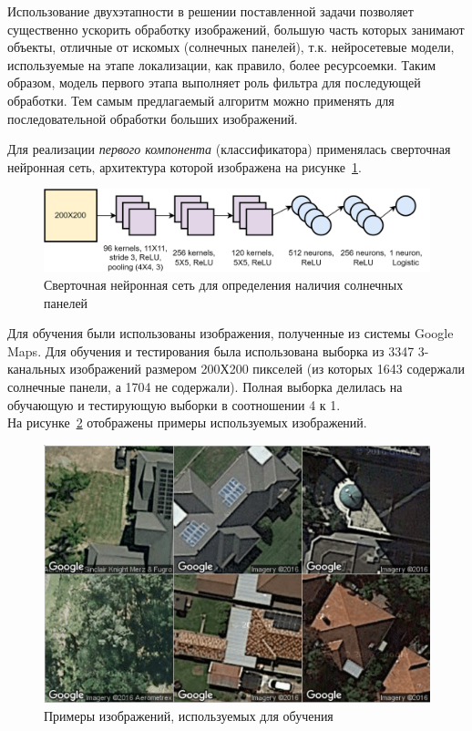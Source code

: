 \documentclass{thesisby}
\begin{document}
Использование двухэтапности в решении поставленной задачи позволяет существенно ускорить обработку изображений, большую часть которых занимают объекты, отличные от искомых (солнечных панелей), т.к. нейросетевые модели, используемые на этапе локализации, как правило, более ресурсоемки. Таким образом, модель первого этапа выполняет роль фильтра для последующей обработки. Тем самым предлагаемый алгоритм можно применять для последовательной обработки больших изображений.

Для реализации \textit{первого компонента} (классификатора) применялась сверточная нейронная сеть, архитектура которой изображена на рисунке~\ref{fig:used_cnn}.
 
\begin{figure}[ht]
	\centering
	\includegraphics[width=17cm]{man-source/images/ch4/pic4-19.png}
	\caption{Сверточная нейронная сеть для определения наличия солнечных панелей}
	\label{fig:used_cnn}
\end{figure}

Для обучения были использованы изображения, полученные из системы Google Maps. Для обучения и тестирования была использована выборка из 3347 3-канальных изображений размером 200Х200 пикселей (из которых 1643 содержали солнечные панели, а 1704 не содержали). Полная выборка делилась на обучающую и тестирующую выборки в соотношении 4 к 1.\\
На рисунке~\ref{fig:google_maps} отображены примеры используемых изображений.
 
\begin{figure}[ht]
	\centering
	\includegraphics[width=12cm]{man-source/images/ch4/pic4-17.png}
	\caption{Примеры изображений, используемых для обучения}
	\label{fig:google_maps}
\end{figure}
\end{document}
